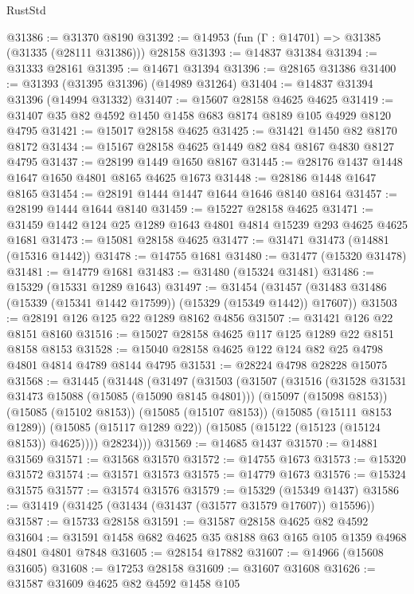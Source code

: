 \begin{lexlean}{RustStd}
\begin{coremodule}
@31386 := @31370 @8190
@31392 := @14953 (fun (Γ : @14701) => @31385 (@31335 (@28111 @31386))) @28158
@31393 := @14837 @31384
@31394 := @31333 @28161
@31395 := @14671 @31394
@31396 := @28165 @31386
@31400 := @31393 (@31395 @31396) (@14989 @31264)
@31404 := @14837 @31394 @31396 (@14994 @31332)
@31407 := @15607 @28158 @4625 @4625
@31419 := @31407 @35 @82 @4592 @1450 @1458 @683 @8174 @8189 @105 @4929 @8120 @4795
@31421 := @15017 @28158 @4625
@31425 := @31421 @1450 @82 @8170 @8172
@31434 := @15167 @28158 @4625 @1449 @82 @84 @8167 @4830 @8127 @4795
@31437 := @28199 @1449 @1650 @8167
@31445 := @28176 @1437 @1448 @1647 @1650 @4801 @8165 @4625 @1673
@31448 := @28186 @1448 @1647 @8165
@31454 := @28191 @1444 @1447 @1644 @1646 @8140 @8164
@31457 := @28199 @1444 @1644 @8140
@31459 := @15227 @28158 @4625
@31471 := @31459 @1442 @124 @25 @1289 @1643 @4801 @4814 @15239 @293 @4625 @4625 @1681
@31473 := @15081 @28158 @4625
@31477 := @31471 @31473 (@14881 (@15316 @1442))
@31478 := @14755 @1681
@31480 := @31477 (@15320 @31478)
@31481 := @14779 @1681
@31483 := @31480 (@15324 @31481)
@31486 := @15329 (@15331 @1289 @1643)
@31497 := @31454
    (@31457 (@31483 @31486 (@15339 (@15341 @1442 @17599)) (@15329 (@15349 @1442)) @17607))
@31503 := @28191 @126 @125 @22 @1289 @8162 @4856
@31507 := @31421 @126 @22 @8151 @8160
@31516 := @15027 @28158 @4625 @117 @125 @1289 @22 @8151 @8158 @8153
@31528 := @15040 @28158 @4625 @122 @124 @82 @25 @4798 @4801 @4814 @4789 @8144 @4795
@31531 := @28224 @4798 @28228 @15075
@31568 := @31445
    (@31448
      (@31497
        (@31503
          (@31507
            (@31516
              (@31528 @31531 @31473 @15088 (@15085 (@15090 @8145 @4801)))
              (@15097 (@15098 @8153))
              (@15085 (@15102 @8153))
              (@15085 (@15107 @8153))
              (@15085 (@15111 @8153 @1289))
              (@15085 (@15117 @1289 @22))
              (@15085 (@15122 (@15123 (@15124 @8153)) @4625))))
          @28234)))
@31569 := @14685 @1437
@31570 := @14881 @31569
@31571 := @31568 @31570
@31572 := @14755 @1673
@31573 := @15320 @31572
@31574 := @31571 @31573
@31575 := @14779 @1673
@31576 := @15324 @31575
@31577 := @31574 @31576
@31579 := @15329 (@15349 @1437)
@31586 := @31419 (@31425 (@31434 (@31437 (@31577 @31579 @17607)) @15596))
@31587 := @15733 @28158
@31591 := @31587 @28158 @4625 @82 @4592
@31604 := @31591 @1458 @682 @4625 @35 @8188 @63 @165 @105 @1359 @4968 @4801 @4801 @7848
@31605 := @28154 @17882
@31607 := @14966 (@15608 @31605)
@31608 := @17253 @28158
@31609 := @31607 @31608
@31626 := @31587
    @31609
    @4625
    @82
    @4592
    @1458
    @105

\end{coremodule}
\end{lexlean}

